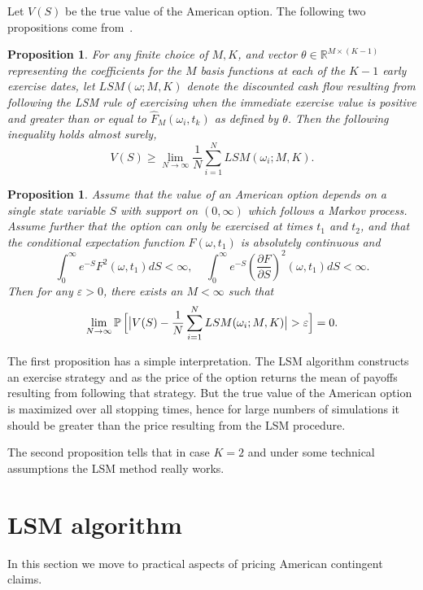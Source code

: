 \documentclass[a4paper,11pt, twoside]{book}
\newtheorem{prop}[thm]{Proposition}
\theoremstyle{definition}
\theoremstyle{remark}
\def\P{{\mathbb{P}}\,}
\def\bpipe{{\bigl|\bigr.}}
\begin{document}
Let $V(S)$ be the true value of the American option. The following two propositions come from~\cite{l-sch}.
\begin{prop}
 For any finite choice of $M, K$, and vector $\theta \in \mathbb{R}^{M \times (K-1)}$ representing the coefficients for the $M$ basis functions at each of the $K-1$ early exercise dates, let $LSM(\omega; M, K)$ denote the discounted cash flow resulting from following the LSM rule of exercising when the immediate exercise value is positive and greater than or equal to $\hat{F}_M(\omega_i, t_k)$ as defined by $\theta$. Then the following inequality holds almost surely,
 \[ V(S) \geq \lim_{N \rightarrow \infty} \frac{1}{N} \sum\limits_{i=1}^N LSM(\omega_i; M, K). \]
\end{prop}
\begin{prop}
 Assume that the value of an American option depends on a single state variable $S$ with support on $(0, \infty)$ which follows a Markov process. Assume further that the option can only be exercised at times $t_1$ and $t_2$, and that the conditional expectation function $F(\omega, t_1)$ is absolutely continuous and
 \[ \int_0^\infty e^{-S} F^2(\omega, t_1) dS < \infty,\ \ \ \ \  \int_0^\infty e^{-S} \left(\frac{\partial F}{\partial S}\right)^2(\omega, t_1) dS < \infty. \]
 Then for any $\varepsilon > 0$, there exists an $M < \infty$ such that
 \[ \lim_{N \rightarrow \infty} \P \Bigl[\bpipe V(S) - \frac{1}{N} \sum\limits_{i=1}^N LSM(\omega_i; M, K) \bpipe > \varepsilon \Bigr] = 0. \]
\end{prop}

The first proposition has a simple interpretation. The LSM algorithm constructs an exercise strategy and as the price of the option returns the mean of payoffs resulting from following that strategy. But the true value of the American option is maximized over all stopping times, hence for large numbers of simulations it should be greater than the price resulting from the LSM procedure.

The second proposition tells that in case $K = 2$ and under some technical assumptions the LSM method really works.

\section{LSM algorithm}
In this section we move to practical aspects of pricing American contingent claims.
\end{document}
